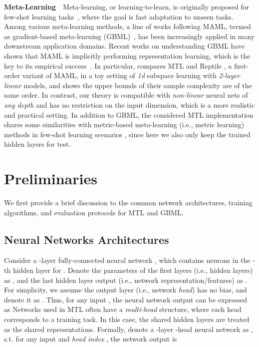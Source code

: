 \documentclass{article}
\begin{document}
\textbf{Meta-Learning}~~Meta-learning, or learning-to-learn, is originally proposed for few-shot learning tasks~\cite{learningtolearn,baxter1998theoretical}, where the goal is fast adaptation to unseen tasks. Among various meta-learning methods, a line of works following MAML, termed as gradient-based meta-learning (GBML)~\citep{maml,imaml}, has been increasingly applied in many downstream application domains. Recent works on understanding GBML have shown that MAML is implicitly performing representation learning, which is the key to its empirical success~\citep{raghu2019rapid}. In particular, \citet{saunshi2020sample} compares MTL and Reptile \cite{reptile}, a first-order variant of MAML, in a toy setting of \textit{1d} subspace learning with \textit{2-layer} \textit{linear} models, and shows the upper bounds of their sample complexity are of the same order. In contrast, our theory is compatible with \textit{non-linear} neural nets of \textit{any depth} and has no restriction on the input dimension, which is a more realistic and practical setting. In addition to GBML, the considered MTL implementation shares some similarities with metric-based meta-learning (i.e., metric learning) methods in few-shot learning scenarios \citep{snell2017prototypical,matching-net}, since here we also only keep the trained hidden layers for test.


\section{Preliminaries}\label{sec:prelim}
We first provide a brief discussion to the common network architectures, training algorithms, and evaluation protocols for MTL and GBML.

\subsection{Neural Networks Architectures}
Consider a -layer fully-connected neural network , which contains  neurons in the -th hidden layer for . Denote the parameters of the first  layers (i.e., hidden layers) as , and the last hidden layer output (i.e., network representation/features) as . For simplicity, we assume the output layer (i.e., network \textit{head}) has no bias, and denote it as . Thus, for any input , the neural network output can be expressed as 
Networks used in MTL often have a \emph{multi-head} structure, where each head corresponds to a training task. In this case, the shared hidden layers are treated as the shared representations. Formally, denote a -layer -head neural network as , s.t. for any input  and \textit{head index} , the network output is
\end{document}
